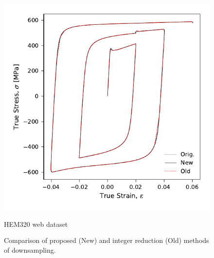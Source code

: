 \documentclass[a4paper,11pt]{article}
\begin{document}
\begin{figure}
    \centering
    \includegraphics{LP8_WP3_HEM320_C_CRM20.pdf}
    \caption{HEM320 web dataset}
    \label{fig:hem320-lp8-compare-methods}
    \caption{Comparison of proposed (New) and integer reduction (Old) methods of downsampling.}
\end{figure}
\end{document}
